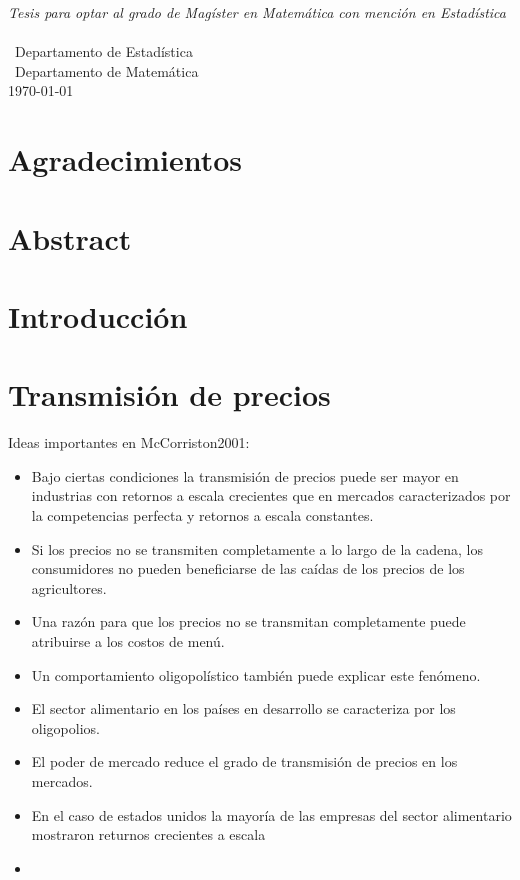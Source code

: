 \documentclass[12pt, twoside]{book}\usepackage[]{graphicx}\usepackage[]{color}
\numberwithin{equation}{section}
\numberwithin{theorem}{section}
\numberwithin{teorema}{section}
\numberwithin{defi}{section}
\numberwithin{prop}{section}
\numberwithin{defi}{section}
\theoremstyle{plain}
\begin{document}
\begin{titlepage}
\begin{center}
\large \textit{Tesis para optar al grado de Magíster en Matemática con mención en Estadística}\\[0.3cm] %
\textit{}\\[0.4cm]
\ Departamento de Estadística \\
[0.4cm]\ Departamento de Matemática
\\[1cm] %
 
{\large \today}\\[2cm] %
 
\end{center}

\end{titlepage}
\newpage



\tableofcontents

\listoffigures
\listoftables
\onehalfspacing
\chapter*{Agradecimientos}
\chapter*{Abstract}
\chapter{Introducción}


\chapter{Transmisión de precios}

Ideas importantes en McCorriston2001: 
\begin{itemize}
\item Bajo ciertas condiciones la transmisión de precios puede ser mayor en industrias con retornos a escala crecientes que en mercados caracterizados por la competencias perfecta y retornos a escala constantes. 
\item Si los precios no se transmiten completamente a lo largo de la cadena, los consumidores no pueden beneficiarse de las caídas de los precios de los agricultores. 
\item Una razón para que los precios no se transmitan completamente puede atribuirse a los costos de menú. 
\item Un comportamiento oligopolístico también puede explicar este fenómeno. 
\item El sector alimentario en los países en desarrollo se caracteriza por los oligopolios. 
\item El poder de mercado reduce el grado de transmisión de precios en los mercados. 
\item En el caso de estados unidos la mayoría de las empresas del sector alimentario mostraron returnos crecientes a escala 
\item 
\end{itemize}
\end{document}
